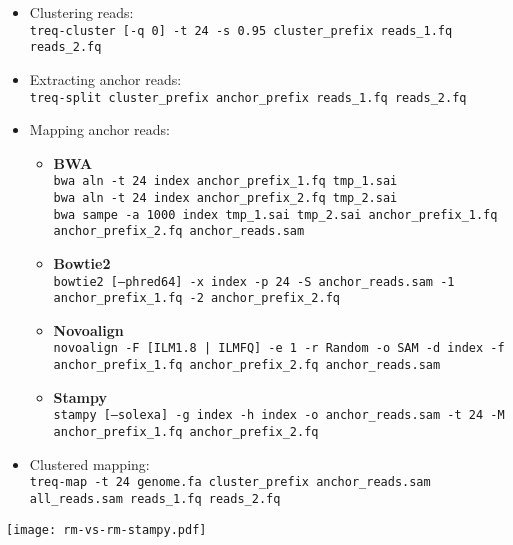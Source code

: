 \documentclass[a4paper]{article}
\begin{document}
\begin{itemize}

\item Clustering reads:\\
  {\tt treq-cluster [-q 0] -t 24 -s 0.95 cluster\_prefix reads\_1.fq reads\_2.fq}
  
\item Extracting anchor reads:\\
  {\tt treq-split cluster\_prefix anchor\_prefix reads\_1.fq reads\_2.fq}
  
\item Mapping anchor reads:\\
\begin{itemize}
 \item {\bf BWA}\\
	{\tt bwa aln -t 24 index anchor\_prefix\_1.fq  tmp\_1.sai }\\
	{\tt bwa aln -t 24 index anchor\_prefix\_2.fq  tmp\_2.sai }\\
	{\tt bwa sampe -a 1000 index tmp\_1.sai tmp\_2.sai anchor\_prefix\_1.fq anchor\_prefix\_2.fq  anchor\_reads.sam }
 \item {\bf Bowtie2}\\
	{\tt bowtie2 [--phred64] -x index -p 24 -S anchor\_reads.sam -1 anchor\_prefix\_1.fq -2 anchor\_prefix\_2.fq }
 \item {\bf Novoalign}\\
	{\tt novoalign -F [ILM1.8 | ILMFQ] -e 1 -r Random -o SAM -d index -f anchor\_prefix\_1.fq anchor\_prefix\_2.fq  anchor\_reads.sam }
 \item {\bf Stampy}\\
        {\tt stampy [--solexa] -g index -h index -o anchor\_reads.sam -t 24 -M anchor\_prefix\_1.fq anchor\_prefix\_2.fq }
\end{itemize}

\item Clustered mapping:\\
 {\tt treq-map -t 24 genome.fa cluster\_prefix anchor\_reads.sam all\_reads.sam reads\_1.fq reads\_2.fq }
\end{itemize}


\begin{figure*}
  \centering
  \texttt{[image: rm-vs-rm-stampy.pdf]} 
  \caption{ \label{fig:rm-vs-rm}
  {\bf Alternate mapping rate between readmappers compared to Stampy.} Alternate mapping rate is shown as a function of MAPQ threshold.}
\end{figure*}
\end{document}
